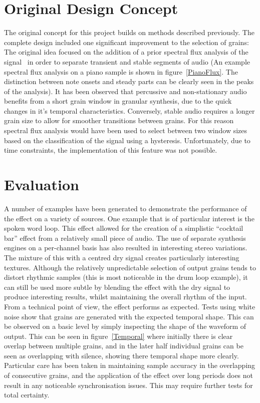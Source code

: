 \documentclass[titlepage]{scrartcl}
\begin{document}
\section{Original Design Concept}\label{OriginalDesign}
The original concept for this project builds on methods described previously.
The complete design included one significant improvement to the selection of
grains: The original idea focused on the addition of a prior spectral flux
analysis of the signal~\parencite[p.44]{Lerch2012} in order to separate
transient and stable segments of audio (An example spectral flux analysis on a
piano sample is shown in figure~\ref{PianoFlux}. The distinction between note
onsets and steady parts can be clearly seen in the peaks of the analysis). It
has been observed that percussive and non-stationary audio benefits from a
short grain window in granular synthesis, due to the quick changes in it's
temporal characteristics.  Conversely, stable audio requires a longer grain
size to allow for smoother transitions between grains. For this reason spectral
flux analysis would have been used to select between two window sizes based on
the classification of the signal using a hysteresis. Unfortunately, due to time
constraints, the implementation of this feature was not possible.

\section{Evaluation}
A number of examples have been generated to demonstrate the performance of the
effect on a variety of sources. One example that is of particular interest is the
spoken word loop. This effect allowed for the creation of a simplistic ``cocktail bar''
effect from a relatively small piece of audio.
The use of separate synthesis engines on a per-channel basis has also resulted
in interesting stereo variations. The mixture of this with a centred dry
signal creates particularly interesting textures. 
Although the relatively unpredictable selection of output grains tends to
distort rhythmic samples (this is most noticeable in the drum loop example), it
can still be used more subtle by blending the effect with the dry signal to
produce interesting results, whilst maintaining the overall rhythm of the
input.\\

From a technical point of view, the effect performs as expected. Tests using
white noise show that grains are generated with the expected temporal shape.
This can be observed on a basic level by simply inspecting the shape of the
waveform of output. This can be seen in figure~\ref{Temporal} where initially
there is clear overlap between multiple grains, and in the later half
individual grains can be seen as overlapping with silence, showing there
temporal shape more clearly.
Particular care has been taken in maintaining sample accuracy in the
overlapping of consecutive grains, and the application of the effect over long
periods does not result in any noticeable synchronisation issues. This may
require further tests for total certainty. 
\end{document}
